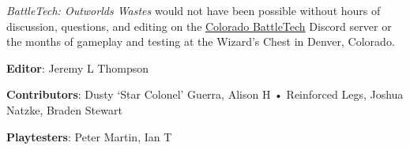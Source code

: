 \emph{BattleTech: Outworlds Wastes} would not have been possible without hours of discussion, questions, and editing on the \href{https://coloradobt.org}{Colorado BattleTech} Discord server or the months of gameplay and testing at the Wizard's Chest in Denver, Colorado.

\begin{description}

\item {\bfseries Editor}: Jeremy L Thompson

\item {\bfseries Contributors}: Dusty ‘Star Colonel’ Guerra, Alison H • Reinforced Legs, Joshua Natzke, Braden Stewart

\item {\bfseries Playtesters}: Peter Martin, Ian T

\end{description}
